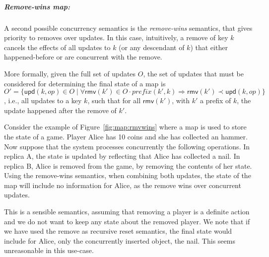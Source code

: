 \documentclass[11pt,a4paper]{article}
\begin{document}
\subparagraph{Remove-wins map:}
A second possible concurrency semantics is the \emph{remove-wins} semantics, 
that gives priority to removes over updates. 
In this case, intuitively, a remove of key $k$ cancels the effects of all updates to $k$ 
(or any descendant of $k$) that either happened-before or are concurrent with the remove.

More formally, given the full set of updates $O$, the set of updates that must be 
considered for determining the final state of a map is 
$O' = \{\mathsf{upd}(k,op) \in O \mid \forall \mathsf{rmv}(k') \in O \cdot \mathit{prefix}(k',k) \Rightarrow 
\mathsf{rmv}(k') \prec \mathsf{upd}(k,op)\}$, i.e., 
all updates to a key $k$, such that for all $\mathsf{rmv}(k')$, with $k'$ a prefix of $k$,
the update happened after the remove of $k'$.

Consider the example of Figure~\ref{fig:map:rmvwins} where a map is used 
to store the state of a game. Player Alice has 10 coins and she has collected an hammer.
Now suppose that the system processes concurrently the following operations. 
In replica A, the state is updated by reflecting that Alice has collected a nail. 
In replica B, Alice is removed from the game, by removing the contents of her state.
Using the remove-wins semantics, when combining both updates, the state of the map
will include no information for Alice, as the remove wins over concurrent updates.

This is a sensible semantics, assuming that removing a player is a definite action and
we do not want to keep any state about the removed player.
We note that if we have used the remove as recursive reset semantics, the final state
would include for Alice, only the concurrently inserted object, the nail. 
This seems unreasonable in this use-case. 


\end{document}
